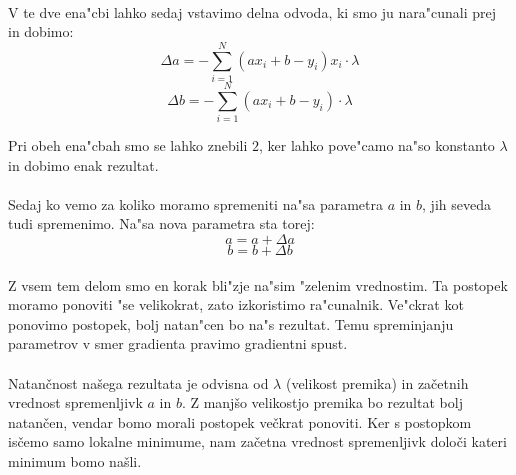 \paragraph{}
V te dve ena"cbi lahko sedaj vstavimo delna odvoda, ki smo ju nara"cunali prej in dobimo:
\[\Delta a = -\sum_{i=1}^{N} (a x_i + b - y_i)x_i \cdot \lambda \]
\[\Delta b = -\sum_{i=1}^{N} (a x_i + b - y_i) \cdot \lambda \]

Pri obeh ena"cbah smo se lahko znebili $2$, ker lahko pove"camo na"so konstanto $\lambda$ in dobimo enak rezultat.

\paragraph{}
Sedaj ko vemo za koliko moramo spremeniti na"sa parametra $a$ in $b$, jih seveda tudi spremenimo. Na"sa nova parametra sta torej:
\[a = a + \Delta a \]
\[b = b + \Delta b \]

\paragraph{}
Z vsem tem delom smo en korak bli"zje na"sim "zelenim vrednostim. Ta postopek moramo ponoviti "se velikokrat, zato izkoristimo ra"cunalnik. Ve"ckrat kot ponovimo postopek, bolj natan"cen bo na"s rezultat. Temu spreminjanju parametrov v smer gradienta pravimo gradientni spust.

\paragraph{}
Natančnost našega rezultata je odvisna od $\lambda$ (velikost premika) in začetnih vrednost spremenljivk $a$ in $b$. Z manjšo velikostjo premika bo rezultat bolj natančen, vendar bomo morali postopek večkrat ponoviti. Ker s postopkom isčemo samo lokalne minimume, nam začetna vrednost spremenljivk določi kateri minimum bomo našli.